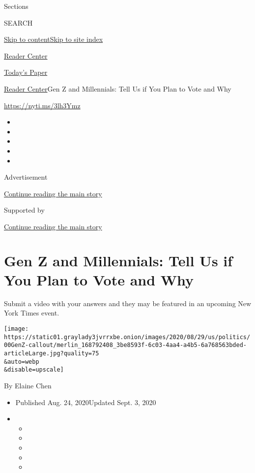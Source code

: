 Sections

SEARCH

\protect\hyperlink{site-content}{Skip to
content}\protect\hyperlink{site-index}{Skip to site index}

\href{https://www.nytimes3xbfgragh.onion/section/reader-center}{Reader
Center}

\href{https://myaccount.nytimes3xbfgragh.onion/auth/login?response_type=cookie\&client_id=vi}{}

\href{https://www.nytimes3xbfgragh.onion/section/todayspaper}{Today's
Paper}

\href{/section/reader-center}{Reader Center}\textbar{}Gen Z and
Millennials: Tell Us if You Plan to Vote and Why

\url{https://nyti.ms/3lh3Ymz}

\begin{itemize}
\item
\item
\item
\item
\item
\end{itemize}

Advertisement

\protect\hyperlink{after-top}{Continue reading the main story}

Supported by

\protect\hyperlink{after-sponsor}{Continue reading the main story}

\hypertarget{gen-z-and-millennials-tell-us-if-you-plan-to-vote-and-why}{%
\section{Gen Z and Millennials: Tell Us if You Plan to Vote and
Why}\label{gen-z-and-millennials-tell-us-if-you-plan-to-vote-and-why}}

Submit a video with your answers and they may be featured in an upcoming
New York Times event.

\texttt{[image: https://static01.graylady3jvrrxbe.onion/images/2020/08/29/us/politics/00GenZ-callout/merlin\_168792408\_3be8593f-6c03-4aa4-a4b5-6a768563bded-articleLarge.jpg?quality=75\\\&auto=webp\\\&disable=upscale]}

By Elaine Chen

\begin{itemize}
\item
  Published Aug. 24, 2020Updated Sept. 3, 2020
\item
  \begin{itemize}
  \item
  \item
  \item
  \item
  \item
  \end{itemize}
\end{itemize}

